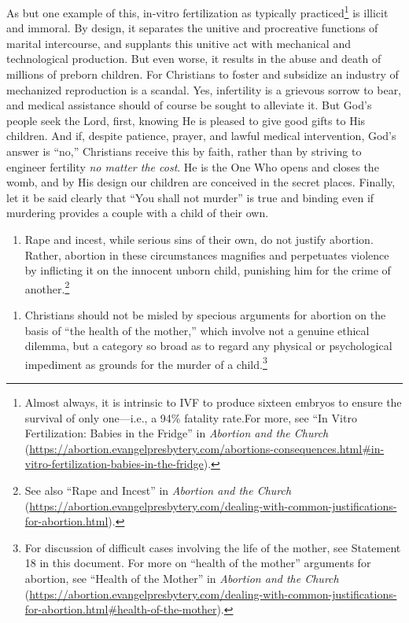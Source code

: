 \documentclass[
]{book}
\providecommand{\tightlist}{%
  \setlength{\itemsep}{0pt}\setlength{\parskip}{0pt}}
\begin{document}
\begin{enumerate}
  As but one example of this, in-vitro fertilization as typically practiced\footnote{Almost always, it is intrinsic to IVF to produce sixteen embryos to ensure the survival of only one---i.e., a 94\% fatality rate.For more, see ``In Vitro Fertilization: Babies in the Fridge'' in \emph{Abortion and the Church} (\url{https://abortion.evangelpresbytery.com/abortions-consequences.html\#in-vitro-fertilization-babies-in-the-fridge}).} is illicit and immoral. By design, it separates the unitive and procreative functions of marital intercourse, and supplants this unitive act with mechanical and technological production. But even worse, it results in the abuse and death of millions of preborn children. For Christians to foster and subsidize an industry of mechanized reproduction is a scandal. Yes, infertility is a grievous sorrow to bear, and medical assistance should of course be sought to alleviate it. But God's people seek the Lord, first, knowing He is pleased to give good gifts to His children. And if, despite patience, prayer, and lawful medical intervention, God's answer is ``no,'' Christians receive this by faith, rather than by striving to engineer fertility \emph{no matter the cost}. He is the One Who opens and closes the womb, and by His design our children are conceived in the secret places. Finally, let it be said clearly that ``You shall not murder'' is true and binding even if murdering provides a couple with a child of their own.
\end{enumerate}

\begin{enumerate}
\def\labelenumi{\arabic{enumi}.}
\setcounter{enumi}{10}
\tightlist
\item
  Rape and incest, while serious sins of their own, do not justify abortion. Rather, abortion in these circumstances magnifies and perpetuates violence by inflicting it on the innocent unborn child, punishing him for the crime of another.\footnote{See also ``Rape and Incest'' in \emph{Abortion and the Church} (\url{https://abortion.evangelpresbytery.com/dealing-with-common-justifications-for-abortion.html}).}
\end{enumerate}

\begin{enumerate}
\def\labelenumi{\arabic{enumi}.}
\setcounter{enumi}{11}
\tightlist
\item
  Christians should not be misled by specious arguments for abortion on the basis of ``the health of the mother,'' which involve not a genuine ethical dilemma, but a category so broad as to regard any physical or psychological impediment as grounds for the murder of a child.\footnote{For discussion of difficult cases involving the life of the mother, see Statement 18 in this document. For more on ``health of the mother'' arguments for abortion, see ``Health of the Mother'' in \emph{Abortion and the Church} (\url{https://abortion.evangelpresbytery.com/dealing-with-common-justifications-for-abortion.html\#health-of-the-mother}).}
\end{enumerate}
\end{document}
